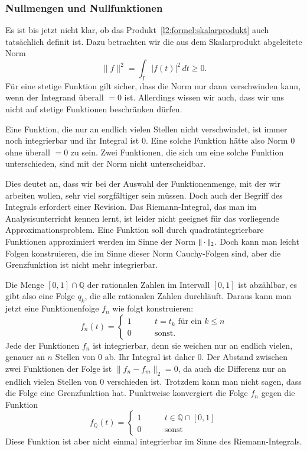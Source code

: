 \subsubsection{Nullmengen und Nullfunktionen}
Es ist bis jetzt nicht klar, ob das Produkt~\eqref{l2:formel:skalarprodukt}
auch tatsächlich definit ist.
Dazu betrachten wir die aus dem Skalarprodukt abgeleitete Norm
\[
\|f\|^2 = \int_I |f(t)|^2\,dt \ge 0.
\]
Für eine stetige Funktion gilt sicher, dass die Norm nur dann verschwinden
kann, wenn der Integrand überall $=0$ ist.
Allerdings wissen wir auch, dass wir uns nicht auf stetige Funktionen
beschränken dürfen.

Eine Funktion, die nur an endlich vielen Stellen nicht verschwindet,
ist immer noch integrierbar und ihr Integral ist $0$.
Eine solche Funktion hätte also Norm $0$ ohne überall $=0$ zu sein.
Zwei Funktionen, die sich um eine solche Funktion unterschieden, 
sind mit der Norm nicht unterscheidbar.

Dies deutet an, dass wir bei der Auswahl der Funktionenmenge, mit der
wir arbeiten wollen, sehr viel sorgfältiger sein müssen.
Doch auch der Begriff des Integrals erfordert einer Revision.
Das Riemann-Integral, das man im Analysisunterricht kennen lernt, 
ist leider nicht geeignet für das vorliegende Approximationsproblem.
Eine Funktion soll durch quadratintegrierbare Funktionen approximiert
werden im Sinne der Norm $\|\mathstrut\cdot\mathstrut\|_2$.
Doch kann man leicht Folgen konstruieren, die im Sinne dieser Norm
Cauchy-Folgen sind, aber die Grenzfunktion ist nicht mehr integrierbar.

\begin{beispiel}
Die Menge $[0,1]\cap \mathbb Q$ der rationalen Zahlen im Intervall
$[0,1]$ ist abzählbar, es gibt  also eine Folge $q_k$, die alle rationalen
Zahlen durchläuft.
Daraus kann man jetzt eine Funktionenfolge $f_n$ wie folgt konstruieren:
\[
f_n(t) = \begin{cases} 
1&\qquad \text{$t=t_k$ für ein $k\le n$}\\
0&\qquad\text{sonst}.
\end{cases}
\]
Jede der Funktionen $f_n$ ist integrierbar, denn sie weichen nur an
endlich vielen, genauer an $n$ Stellen von $0$ ab.
Ihr Integral ist daher $0$.
Der Abstand zwischen zwei Funktionen der Folge ist $\| f_n-f_m\|_2 = 0$,
da auch die Differenz nur an endlich vielen Stellen von $0$ verschieden ist.
Trotzdem kann man nicht sagen, dass die Folge eine Grenzfunktion hat.
Punktweise konvergiert die Folge $f_n$ gegen die Funktion
\[
f_{\mathbb Q}(t) = \begin{cases}
1&\qquad t\in\mathbb Q\cap [0,1]\\
0&\qquad\text{sonst}
\end{cases}
\]
Diese Funktion ist aber nicht einmal integrierbar im Sinne des
Riemann-Integrals.
\end{beispiel}

